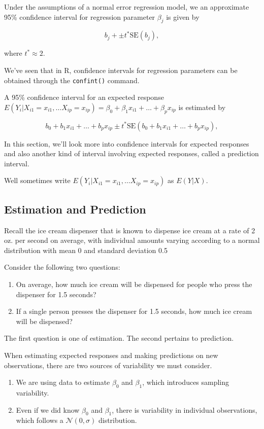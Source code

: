 \documentclass[
  letterpaper,
  DIV=11,
  numbers=noendperiod]{scrreprt}
\providecommand{\tightlist}{%
  \setlength{\itemsep}{0pt}\setlength{\parskip}{0pt}}\usepackage{longtable,booktabs,array}
\begin{document}
Under the assumptions of a normal error regression model, we an
approximate 95\% confidence interval for regression parameter
\(\beta_j\) is given by

\[ b_j + \pm t^*\text{SE}(b_j), \]

where \(t^*\approx 2\).

We've seen that in R, confidence intervals for regression parameters can
be obtained through the \texttt{confint()} command.

A 95\% confidence interval for an expected response
\(E(Y_i|X_{i1}=x_{i1}, \ldots X_{ip}=x_{ip}) = \beta_0 + \beta_1x_{i1} + \ldots + \beta_px_{ip}\)
is estimated by

\[ b_0 + b_1x_{i1} + \ldots + b_px_{ip} \pm t^*\text{SE}(b_0 + b_1x_{i1} + \ldots + b_px_{ip}), \]

In this section, we'll look more into confidence intervals for expected
responses and also another kind of interval involving expected
responses, called a prediction interval.

Well sometimes write \(E(Y_i|X_{i1}=x_{i1}, \ldots X_{ip}=x_{ip})\) as
\(E(Y|X)\).

\subsection{Estimation and Prediction}\label{estimation-and-prediction}

Recall the ice cream dispenser that is known to dispense ice cream at a
rate of 2 oz. per second on average, with individual amounts varying
according to a normal distribution with mean 0 and standard deviation
0.5

Consider the following two questions:

\begin{enumerate}
\def\labelenumi{\arabic{enumi}.}
\item
  On average, how much ice cream will be dispensed for people who press
  the dispenser for 1.5 seconds?
\item
  If a single person presses the dispenser for 1.5 seconds, how much ice
  cream will be dispensed?
\end{enumerate}

The first question is one of estimation. The second pertains to
prediction.

When estimating expected responses and making predictions on new
observations, there are two sources of variability we must consider.

\begin{enumerate}
\def\labelenumi{\arabic{enumi}.}
\tightlist
\item
  We are using data to estimate \(\beta_0\) and \(\beta_1\), which
  introduces sampling variability.\\
\item
  Even if we did know \(\beta_0\) and \(\beta_1\), there is variability
  in individual observations, which follows a \(\mathcal{N}(0, \sigma)\)
  distribution.
\end{enumerate}
\end{document}

